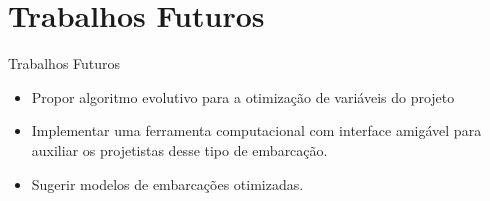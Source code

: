 \documentclass{beamer}
\begin{document}
\section{Trabalhos Futuros}
\begin{frame}
\tableofcontents[ 
    currentsubsection, 
    hideothersubsections, 
    sectionstyle=show/shaded
    ] 
\end{frame}
\begin{frame}{Trabalhos Futuros}
\begin{itemize}
	\item Propor algoritmo evolutivo para a otimização de variáveis do projeto
	\item Implementar uma ferramenta computacional com interface amigável para auxiliar os projetistas desse tipo de embarcação.
	\item Sugerir modelos de embarcações otimizadas.
\end{itemize}

\end{frame}

\end{document}
